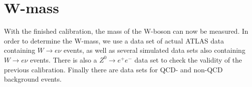 \section{W-mass}
\label{sec:w-mass}
With the finished calibration, the mass of the W-boson can now be measured. 
In order to determine the W-mass, we use a data set of actual ATLAS data containing $W \rightarrow e\nu$ events,
as well as several simulated data sets also containing $W \rightarrow e\nu$ events. 
There is also a $Z^0 \rightarrow e^+e^-$ data set to check the validity of the previous calibration. Finally there are data sets for QCD- and non-QCD background events.
